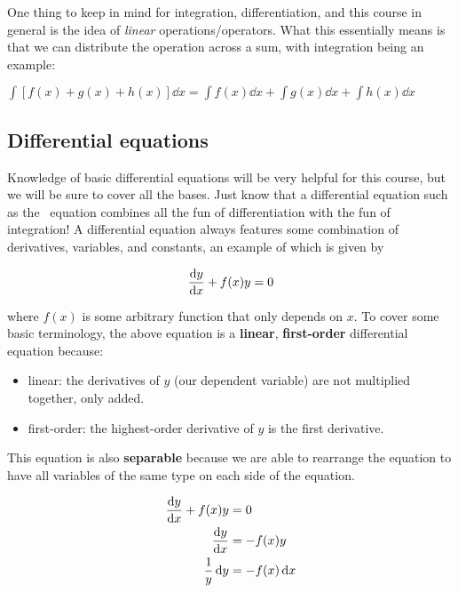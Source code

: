 One thing to keep in mind for integration, differentiation, and this course in general is the idea of \emph{linear} operations/operators. 
What this essentially means is that we can distribute the operation across a sum, with integration being an example:

\begin{tcolorbox}[title=Linear operations---integration example]
	$\displaystyle\int \left[ f(x) + g(x) + h(x) \right]\dd{x} = \displaystyle\int f(x)\dd{x} + \displaystyle\int g(x)\dd{x} + \displaystyle\int h(x)\dd{x}$
\end{tcolorbox}



\subsection{Differential equations}

Knowledge of basic differential equations will be very helpful for this course, but we will be sure to cover all the bases. 
Just know that a differential equation such as the \Sch\ equation combines all the fun of differentiation with the fun of integration! 
A differential equation always features some combination of derivatives, variables, and constants, an example of which is given by 

\[ \dv{y}{x} + f(x)y = 0 \] 

\noindent where $f(x)$ is some arbitrary function that only depends on $x$. 
To cover some basic terminology, the above equation is a \textbf{linear}, \textbf{first-order} differential equation because:

\begin{itemize}
	\item linear: the derivatives of $y$ (our dependent variable) are not multiplied together, only added.
	
	\item first-order: the highest-order derivative of $y$ is the first derivative. 
\end{itemize}

This equation is also \textbf{separable} because we are able to rearrange the equation to have all variables of the same type on each side of the equation.

\begin{align*}
	\dv{y}{x} + f(x)y &= 0 \\
	\dv{y}{x} &= -f(x)y \\
	\frac{1}{y}\dd{y} &= -f(x)\dd{x}
\end{align*}

